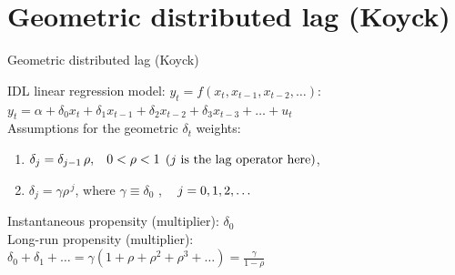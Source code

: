 \documentclass{beamer}
\begin{document}
\section{Geometric distributed lag (Koyck) }
\begin{frame}{Geometric distributed lag (Koyck) }

IDL linear regression model: $y_t = f(x_t, x_{t-1}, x_{t-2}, \dots)$: 
\\ \vspace{0.3cm}
$ y_t = \alpha + \delta_0 x_t + \delta_1 x_{t-1} + \delta_2 x_{t-2} + \delta_3 x_{t-3} 
+ \dots + u_t$ \\ \vspace{0.3cm}
Assumptions for the geometric $\delta_t$ weights:
\begin{enumerate}
\item $\delta_j = \delta_{j-1}\, \rho, \hspace{0.3cm} 0 < \rho < 1 $ \quad $\left( j \textnormal{~is the lag operator here} \right)$,
\item $ \delta_{j} = \gamma \rho^{\,j}$, \hspace{0.3cm} where $\gamma \equiv \delta_0$ , $\hspace{0.3cm} j=0,1,2,\dots $
\end{enumerate}
 
\vspace{0.3cm}
Instantaneous propensity (multiplier): $ \delta_0$ 
\\ \vspace{0.3cm}
Long-run propensity (multiplier):
\\ \vspace{0.3cm}
$\delta_0+\delta_1+\dots=\gamma(1+\rho+\rho^2+\rho^3+\dots)=\frac{\gamma}{1-\rho}$

\end{frame}
\end{document}
